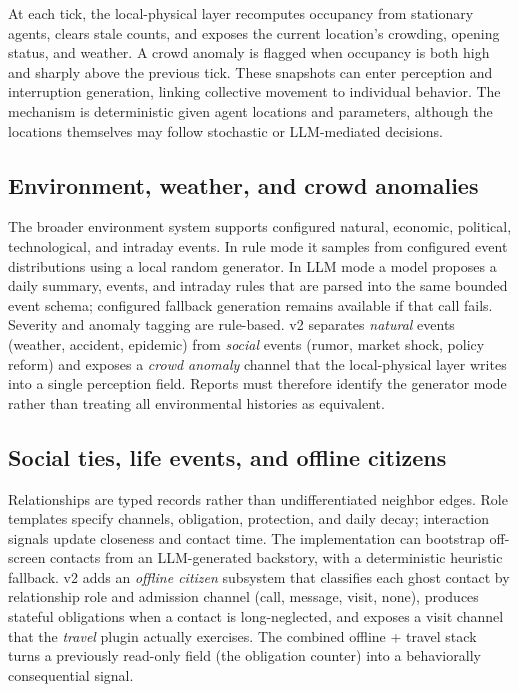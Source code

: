 At each tick, the local-physical layer recomputes occupancy from stationary
agents, clears stale counts, and exposes the current location's crowding,
opening status, and weather.  A crowd anomaly is flagged when occupancy is
both high and sharply above the previous tick.  These snapshots can enter
perception and interruption generation, linking collective movement to
individual behavior.  The mechanism is deterministic given agent locations
and parameters, although the locations themselves may follow stochastic or
LLM-mediated decisions.

\subsection{Environment, weather, and crowd anomalies}

The broader environment system supports configured natural, economic,
political, technological, and intraday events.  In rule mode it samples from
configured event distributions using a local random generator.  In LLM mode
a model proposes a daily summary, events, and intraday rules that are
parsed into the same bounded event schema; configured fallback generation
remains available if that call fails.  Severity and anomaly tagging are
rule-based.  v2 separates \emph{natural} events (weather, accident,
epidemic) from \emph{social} events (rumor, market shock, policy reform) and
exposes a \emph{crowd anomaly} channel that the local-physical layer writes
into a single perception field.  Reports must therefore identify the
generator mode rather than treating all environmental histories as
equivalent.

\subsection{Social ties, life events, and offline citizens}

Relationships are typed records rather than undifferentiated neighbor edges.
Role templates specify channels, obligation, protection, and daily decay;
interaction signals update closeness and contact time.  The implementation
can bootstrap off-screen contacts from an LLM-generated backstory, with a
deterministic heuristic fallback.  v2 adds an \emph{offline citizen}
subsystem that classifies each ghost contact by relationship role and
admission channel (call, message, visit, none), produces stateful obligations
when a contact is long-neglected, and exposes a visit channel that the
\emph{travel} plugin \citep{gaworldtravel} actually exercises.  The combined
offline + travel stack turns a previously read-only field (the obligation
counter) into a behaviorally consequential signal.

